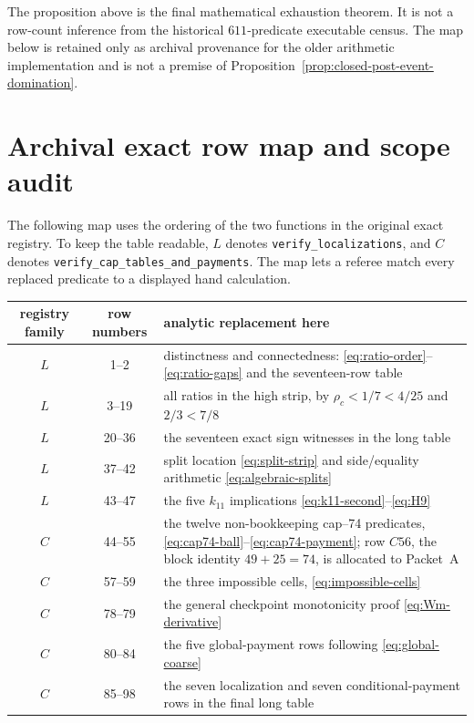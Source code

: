 \documentclass[11pt]{article}
\begin{document}
The proposition above is the final mathematical exhaustion theorem.  It
is not a row-count inference from the historical \(611\)-predicate
executable census.  The map below is retained only as archival provenance
for the older arithmetic implementation and is not a premise of
Proposition~\ref{prop:closed-post-event-domination}.

\section{Archival exact row map and scope audit}

The following map uses the ordering of the two functions in the original
exact registry.  To keep the table readable, \(L\) denotes
\texttt{verify\_localizations}, and \(C\) denotes
\texttt{verify\_cap\_tables\_and\_payments}.  The map lets a referee match
every replaced predicate to a displayed hand calculation.

\begin{center}
\small
\renewcommand{\arraystretch}{1.16}
\begin{tabular}{@{}c c L{12.1cm}@{}}
\toprule
registry family&row numbers&analytic replacement here\\
\midrule
\(L\)&1--2&distinctness and connectedness:
\eqref{eq:ratio-order}--\eqref{eq:ratio-gaps} and the seventeen-row table\\
\(L\)&3--19&all ratios in the high strip, by
\(\rho_c<1/7<4/25\) and \(2/3<7/8\)\\
\(L\)&20--36&the seventeen exact sign witnesses in
the long table\\
\(L\)&37--42&split location
\eqref{eq:split-strip} and side/equality arithmetic
\eqref{eq:algebraic-splits}\\
\(L\)&43--47&the five \(k_{11}\) implications
\eqref{eq:k11-second}--\eqref{eq:H9}\\
\(C\)&44--55&the twelve non-bookkeeping cap--74
predicates, \eqref{eq:cap74-ball}--\eqref{eq:cap74-payment};
row \(C56\), the block identity \(49+25=74\), is allocated to Packet~A\\
\(C\)&57--59&the three impossible
cells, \eqref{eq:impossible-cells}\\
\(C\)&78--79&the general checkpoint
monotonicity proof \eqref{eq:Wm-derivative}\\
\(C\)&80--84&the five global-payment
rows following \eqref{eq:global-coarse}\\
\(C\)&85--98&the seven localization
and seven conditional-payment rows in the final long table\\
\bottomrule
\end{tabular}
\end{center}
\end{document}
